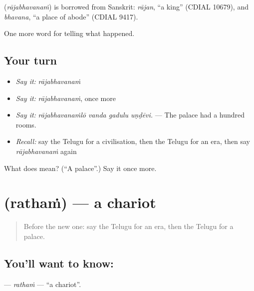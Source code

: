 \begin{cousinweb}
\textbf{} (\emph{rājabhavanaṁ}) is borrowed from Sanskrit: \emph{rājan}, \textquotedblleft{}a king\textquotedblright{} (CDIAL 10679), and \emph{bhavana}, \textquotedblleft{}a place of abode\textquotedblright{} (CDIAL 9417).
\end{cousinweb}

\begin{grammarlens}[title={What you've built}]
One more word for telling what happened.
\end{grammarlens}

\subsection*{Your turn}
\begin{itemize}
\raggedright
  \item \emph{Say it:} \emph{rājabhavanaṁ}
  \item \emph{Say it:} \emph{rājabhavanaṁ}, once more
  \item \emph{Say it:} \emph{rājabhavanaṁlō vanda gadulu uṇḍēvi.} — The palace had a hundred rooms.
  \item \emph{Recall:} say the Telugu for a civilisation, then the Telugu for an era, then say \emph{rājabhavanaṁ} again
\end{itemize}

\begin{tcolorbox}[breakable,colback=teal!4,colframe=teal!35!black,title={Before you move on}]
What does  mean? (\textquotedblleft{}A palace\textquotedblright{}.) Say it once more.
\end{tcolorbox}
\section[\texorpdfstring{\te{రథం} (rathaṁ)}{రథం (rathaṁ)}]{ (rathaṁ) — a chariot}

\label{lesson:TE-C369-ratham}



\begin{quote}
Before the new one: say the Telugu for an era, then the Telugu for a palace.
\end{quote}

\subsection*{You'll want to know: }
\textbf{} — \emph{rathaṁ} — \textquotedblleft{}a chariot\textquotedblright{}.

